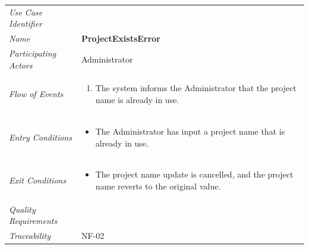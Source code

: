 \documentclass[12pt,letterpaper]{article}
\begin{document}
\begin{center}
	\begin{tabu} to 
		\toprule
		Use Case Identifier & \projectexistserror{} \\
		Name & {\bf ProjectExistsError} \\
		Participating Actors & Administrator \\
		Flow of Events & 
		\begin{minipage}[t]{\linewidth}
		    \begin{enumerate}
			    \item The system informs the Administrator that the project name is already in use.
			\end{enumerate}
		\end{minipage} \\

		Entry Conditions &
		\begin{minipage}[t]{\linewidth}
			\begin{itemize}
			    \item The Administrator has input a project name that is already in use.
	        \end{itemize}
		\end{minipage} \\

		Exit Conditions &
		\begin{minipage}[t]{\linewidth}
			\begin{itemize}
			    \item The project name update is cancelled, and the project name reverts to the original value.
	        \end{itemize}
		\end{minipage} \\

		Quality Requirements & \\

		Traceability & NF-02 \\
		\toprule
	\end{tabu}
\end{center}
\end{document}
